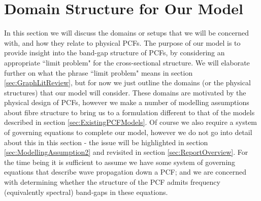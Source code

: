 \section{Domain Structure for Our Model} \label{sec:OurPhysicalSetup}
In this section we will discuss the domains or setups that we will be concerned with, and how they relate to physical PCFs.
The purpose of our model is to provide insight into the band-gap structure of PCFs, by considering an appropriate ``limit problem" for the cross-sectional structure.
We will elaborate further on what the phrase ``limit problem" means in section \ref{sec:GraphLitReview}, but for now we just outline the domains (or the physical structures) that our model will consider.
These domains are motivated by the physical design of PCFs, however we make a number of modelling assumptions about fibre structure to bring us to a formulation different to that of the models described in section \ref{sec:ExistingPCFModels}.
Of course we also require a system of governing equations to complete our model, however we do not go into detail about this in this section - the issue will be highlighted in section \ref{sec:ModellingAssumption2} and revisited in section \ref{sec:ReportOverview}.
For the time being it is sufficient to assume we have some system of governing equations that describe wave propagation down a PCF; and we are concerned with determining whether the structure of the PCF admits frequency (equivalently spectral) band-gaps in these equations. \newline

